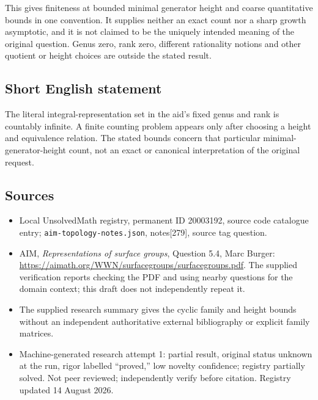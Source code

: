 \documentclass[11pt]{article}
\begin{document}
This gives finiteness at bounded minimal generator height and coarse quantitative bounds in one convention. It supplies neither an exact count nor a sharp growth asymptotic, and it is not claimed to be the uniquely intended meaning of the original question. Genus zero, rank zero, different rationality notions and other quotient or height choices are outside the stated result.
\subsection{Short English statement}
The literal integral-representation set in the aid’s fixed genus and rank is countably infinite. A finite counting problem appears only after choosing a height and equivalence relation. The stated bounds concern that particular minimal-generator-height count, not an exact or canonical interpretation of the original request.
\subsection{Sources}
\begin{itemize}
\item Local UnsolvedMath registry, permanent ID 20003192, source code catalogue entry; \texttt{aim-topology-notes.json}, notes[279], source tag question.
\item AIM, \emph{Representations of surface groups}, Question 5.4, Marc Burger: \url{https://aimath.org/WWN/surfacegroups/surfacegroups.pdf}. The supplied verification reports checking the PDF and using nearby questions for the domain context; this draft does not independently repeat it.
\item The supplied research summary gives the cyclic family and height bounds without an independent authoritative external bibliography or explicit family matrices.
\item Machine-generated research attempt 1: partial result, original status unknown at the run, rigor labelled ``proved,'' low novelty confidence; registry partially solved. Not peer reviewed; independently verify before citation. Registry updated 14 August 2026.
\end{itemize}
\end{document}
